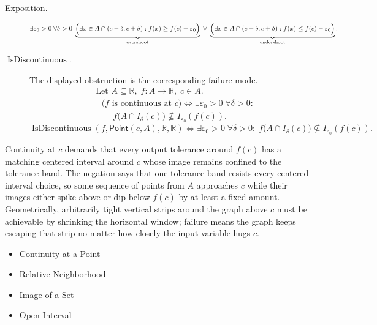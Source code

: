 \begin{remark*}
\begin{description}
  \item[Exposition.]
\[
\exists \varepsilon_{0} > 0\; \forall \delta > 0\;
\underbrace{\Bigl(
\exists x \in A \cap (c-\delta,c+\delta): f(x) \ge f(c)+\varepsilon_{0}
\Bigr)}_{\text{overshoot}}
\;\lor\;
\underbrace{\Bigl(
\exists x \in A \cap (c-\delta,c+\delta): f(x) \le f(c)-\varepsilon_{0}
\Bigr)}_{\text{undershoot}}.
\]


  \item[\(\operatorname{IsDiscontinuous}.\)]
  The displayed obstruction is the corresponding failure mode.
  \[
\begin{aligned}
&\text{Let } A \subseteq \mathbb{R},\; f:A \to \mathbb{R},\; c \in A.\\
&\neg\bigl(f \text{ is continuous at } c\bigr) \Longleftrightarrow \exists \varepsilon_{0} > 0\; \forall \delta > 0:\\
&\qquad f\bigl(A \cap I_\delta(c)\bigr) \nsubseteq I_{\varepsilon_0}(f(c)).
\end{aligned}
  \]
  \[
\operatorname{IsDiscontinuous}(f,\mathsf{Point}(c,A),\mathbb R,\mathbb R)
\Longleftrightarrow
\exists \varepsilon_{0} > 0\; \forall \delta > 0:\;
f\bigl(A \cap I_\delta(c)\bigr) \nsubseteq I_{\varepsilon_0}(f(c)).
  \]
\end{description}
\end{remark*}

\begin{remark*}[Interpretation]
Continuity at $c$ demands that every output tolerance around $f(c)$ has a matching centered interval around $c$ whose image remains confined to the tolerance band. The negation says that one tolerance band resists every centered-interval choice, so some sequence of points from $A$ approaches $c$ while their images either spike above or dip below $f(c)$ by at least a fixed amount. Geometrically, arbitrarily tight vertical strips around the graph above $c$ must be achievable by shrinking the horizontal window; failure means the graph keeps escaping that strip no matter how closely the input variable hugs $c$.
\end{remark*}

\begin{dependencies}
\begin{itemize}
  \item \hyperref[def:continuous-at-point]{Continuity at a Point}
  \item \hyperref[def:relative-neighborhood]{Relative Neighborhood}
  \item \hyperref[def:image-set]{Image of a Set}
  \item \hyperref[def:open-interval]{Open Interval}
\end{itemize}
\end{dependencies}

